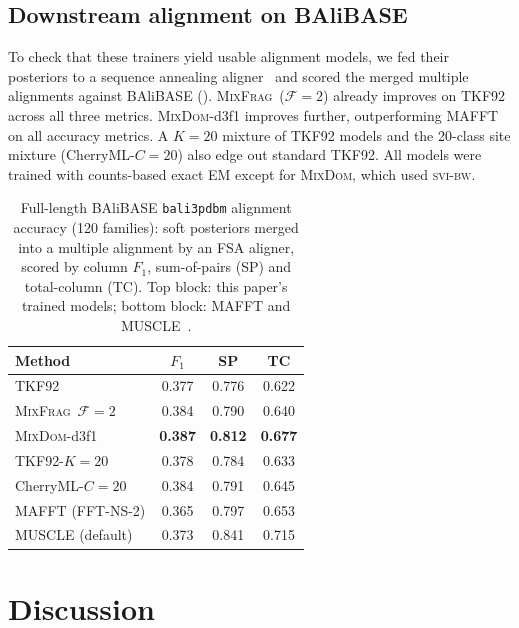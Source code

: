 \documentclass[11pt]{article}
\newcommand{\MixFrag}{\textsc{MixFrag}}
\newcommand{\MixDom}{\textsc{MixDom}}
\newcommand{\svibw}{\textsc{svi-bw}}
\begin{document}
\subsection{Downstream alignment on BAliBASE}

To check that these trainers yield usable alignment models, we fed their
posteriors to a sequence annealing aligner~\citep{BradleyEtAl2009} and scored the merged
multiple alignments against BAliBASE (). \MixFrag\ ($\mathcal F{=}2$)
already improves on TKF92 across all three metrics. \MixDom-d3f1 improves further,
outperforming MAFFT on
all accuracy metrics.
A $K{=}20$ mixture of TKF92 models and the
20-class site mixture (CherryML-$C{=}20$) also edge out standard TKF92. 
All models were trained with counts-based exact EM except for \MixDom, which used \svibw.

\begin{table}[t]
\caption{Full-length BAliBASE
\texttt{bali3pdbm} alignment accuracy (120 families): soft posteriors
merged into a multiple alignment by an FSA aligner, scored by column
$F_1$, sum-of-pairs (SP) and total-column (TC). Top block: this paper's
trained models; bottom block: MAFFT and MUSCLE~\citep{Katoh2013,Edgar2004}.}
\label{tab:balibase}
\centering
\setlength{\tabcolsep}{5pt}
\begin{tabular}{@{}lccc@{}}
\toprule
Method & $F_1$ & SP & TC \\
\midrule
TKF92            & 0.377 & 0.776 & 0.622 \\
\MixFrag\ $\mathcal F{=}2$ & 0.384 & 0.790 & 0.640 \\
\MixDom-d3f1     & \textbf{0.387} & \textbf{0.812} & \textbf{0.677} \\
TKF92-$K{=}20$   & 0.378 & 0.784 & 0.633 \\
CherryML-$C{=}20$ & 0.384 & 0.791 & 0.645 \\
\midrule
MAFFT (FFT-NS-2) & 0.365 & 0.797 & 0.653 \\
MUSCLE (default) & 0.373 & 0.841 & 0.715 \\
\bottomrule
\end{tabular}
\end{table}

\section{Discussion}
\label{sec:discussion}
\end{document}
